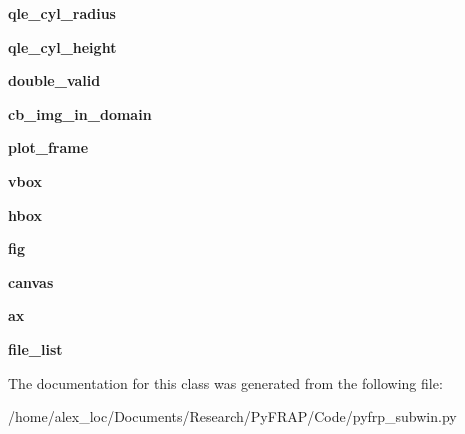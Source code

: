 \begin{DoxyCompactItemize}
\item 
\hypertarget{classpyfrp__subwin_1_1geometry__dialog_a59d816e92d535cb3d11e9fcb36f465df}{{\bfseries qle\+\_\+cyl\+\_\+radius}}\label{classpyfrp__subwin_1_1geometry__dialog_a59d816e92d535cb3d11e9fcb36f465df}

\item 
\hypertarget{classpyfrp__subwin_1_1geometry__dialog_a04225149332ba7992c692ca2681b9b0b}{{\bfseries qle\+\_\+cyl\+\_\+height}}\label{classpyfrp__subwin_1_1geometry__dialog_a04225149332ba7992c692ca2681b9b0b}

\item 
\hypertarget{classpyfrp__subwin_1_1geometry__dialog_af85bcb5269e371fd2075979d45a48f2d}{{\bfseries double\+\_\+valid}}\label{classpyfrp__subwin_1_1geometry__dialog_af85bcb5269e371fd2075979d45a48f2d}

\item 
\hypertarget{classpyfrp__subwin_1_1geometry__dialog_aa48db198848beeb0ab1ce863a84239ef}{{\bfseries cb\+\_\+img\+\_\+in\+\_\+domain}}\label{classpyfrp__subwin_1_1geometry__dialog_aa48db198848beeb0ab1ce863a84239ef}

\item 
\hypertarget{classpyfrp__subwin_1_1geometry__dialog_a0bbf6e041a275349cec04daca93ede15}{{\bfseries plot\+\_\+frame}}\label{classpyfrp__subwin_1_1geometry__dialog_a0bbf6e041a275349cec04daca93ede15}

\item 
\hypertarget{classpyfrp__subwin_1_1geometry__dialog_a2690e455c16124c0acacd7ca6e61f7fe}{{\bfseries vbox}}\label{classpyfrp__subwin_1_1geometry__dialog_a2690e455c16124c0acacd7ca6e61f7fe}

\item 
\hypertarget{classpyfrp__subwin_1_1geometry__dialog_a1e06d8e8be3608ac316c199ed7d90149}{{\bfseries hbox}}\label{classpyfrp__subwin_1_1geometry__dialog_a1e06d8e8be3608ac316c199ed7d90149}

\item 
\hypertarget{classpyfrp__subwin_1_1geometry__dialog_ab30dcaf8de9734ac78ef7ea4d23b5ae2}{{\bfseries fig}}\label{classpyfrp__subwin_1_1geometry__dialog_ab30dcaf8de9734ac78ef7ea4d23b5ae2}

\item 
\hypertarget{classpyfrp__subwin_1_1geometry__dialog_a16bc9aebebcf848672ef9d78ebeace64}{{\bfseries canvas}}\label{classpyfrp__subwin_1_1geometry__dialog_a16bc9aebebcf848672ef9d78ebeace64}

\item 
\hypertarget{classpyfrp__subwin_1_1geometry__dialog_ad3856b746dc6129ab1bc2da530b8b1ae}{{\bfseries ax}}\label{classpyfrp__subwin_1_1geometry__dialog_ad3856b746dc6129ab1bc2da530b8b1ae}

\item 
\hypertarget{classpyfrp__subwin_1_1geometry__dialog_a14d66928e5a3356137f8c2e7aaef363c}{{\bfseries file\+\_\+list}}\label{classpyfrp__subwin_1_1geometry__dialog_a14d66928e5a3356137f8c2e7aaef363c}

\end{DoxyCompactItemize}


The documentation for this class was generated from the following file\+:\begin{DoxyCompactItemize}
\item 
/home/alex\+\_\+loc/\+Documents/\+Research/\+Py\+F\+R\+A\+P/\+Code/pyfrp\+\_\+subwin.\+py\end{DoxyCompactItemize}
